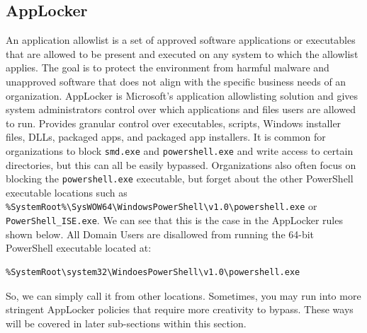 \subsection{AppLocker}
An application allowlist is a set of approved software applications or executables that are allowed to be present and executed on any system to which the allowlist applies. The goal is to protect the environment from harmful malware and unapproved software that does not align with the specific business needs of an organization. AppLocker is Microsoft's application allowlisting solution and gives system administrators control over which applications and files users are allowed to run. Provides granular control over executables, scripts, Windows installer files, DLLs, packaged apps, and packaged app installers. It is common for organizations to block \texttt{smd.exe} and \texttt{powershell.exe} and write access to certain directories, but this can all be easily bypassed. Organizations also often focus on blocking the \texttt{powershell.exe} executable, but forget about the other PowerShell executable locations such as \verb|%SystemRoot%\SysWOW64\WindowsPowerShell\v1.0\powershell.exe| or \texttt{PowerShell_ISE.exe}. We can see that this is the case in the AppLocker rules shown below. All Domain Users are disallowed from running the 64-bit PowerShell executable located at:
\begin{notebox}
\begin{verbatim}
%SystemRoot\system32\WindoesPowerShell\v1.0\powershell.exe
\end{verbatim}
\end{notebox}
So, we can simply call it from other locations. Sometimes, you may run into more stringent AppLocker policies that require more creativity to bypass. These ways will be covered in later sub-sections within this section.

